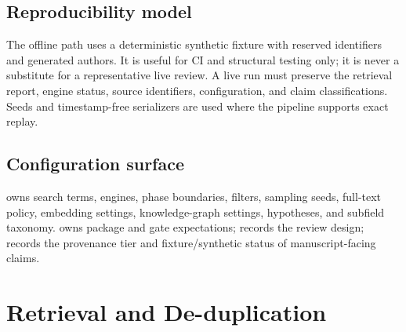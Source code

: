 \documentclass[
]{article}
\begin{document}
\subsection{Reproducibility model}\label{reproducibility-model}

The offline path uses a deterministic synthetic fixture with reserved
identifiers and generated authors. It is useful for CI and structural
testing only; it is never a substitute for a representative live review.
A live run must preserve the retrieval report, engine status, source
identifiers, configuration, and claim classifications. Seeds and
timestamp-free serializers are used where the pipeline supports exact
replay.

\subsection{Configuration surface}\label{configuration-surface}

 owns search terms, engines, phase
boundaries, filters, sampling seeds, full-text policy, embedding
settings, knowledge-graph settings, hypotheses, and subfield taxonomy.
 owns package and gate expectations;
 records the review design;
 records the provenance tier and
fixture/synthetic status of manuscript-facing claims.

\newpage

\section{Retrieval and
De-duplication}\label{retrieval-and-de-duplication}
\end{document}
